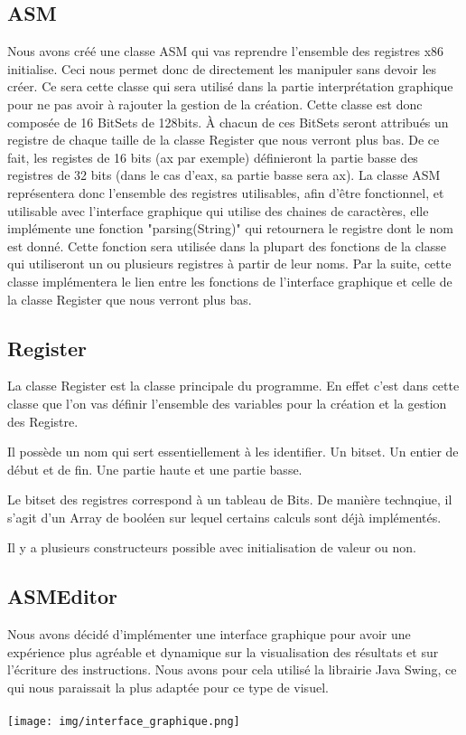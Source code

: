 \documentclass{article}
\begin{document}
\subsection{ASM}
Nous avons créé une classe ASM qui vas reprendre l'ensemble des registres x86 initialise. Ceci nous permet donc de directement les manipuler sans devoir les créer. Ce sera cette classe qui sera utilisé dans la partie interprétation graphique pour ne pas avoir à rajouter la gestion de la création.
Cette classe est donc composée de 16 BitSets de 128bits. À chacun de ces BitSets seront attribués un registre de chaque taille de la classe Register que nous verront plus bas. De ce fait, les registes de 16 bits (ax par exemple) définieront la partie basse des registres de 32 bits (dans le cas d'eax, sa partie basse sera ax).
La classe ASM représentera donc l'ensemble des registres utilisables, afin d'être fonctionnel, et utilisable avec l'interface graphique qui utilise des chaines de caractères, elle implémente une fonction "parsing(String)" qui retournera le registre dont le nom est donné.
Cette fonction sera utilisée dans la plupart des fonctions de la classe qui utiliseront un ou plusieurs registres à partir de leur noms. Par la suite, cette classe implémentera le lien entre les fonctions de l'interface graphique et celle de la classe Register que nous verront plus bas.

\subsection{Register}
La classe Register est la classe principale du programme. En effet c'est dans cette classe que l'on vas définir l'ensemble des variables pour la création et la gestion des Registre.

Il possède un nom qui sert essentiellement à les identifier.
Un bitset.
Un entier de début et de fin.
Une partie haute et une partie basse.

Le bitset des registres correspond à un tableau de Bits. De manière technqiue, il s'agit d'un Array de booléen sur lequel certains calculs sont déjà implémentés.

Il y a plusieurs constructeurs possible avec initialisation de valeur ou non.

\subsection{ASMEditor}

Nous avons décidé d'implémenter une interface graphique pour avoir une expérience plus agréable et dynamique sur la visualisation des résultats et sur
l'écriture des instructions.
Nous avons pour cela utilisé la librairie Java Swing, ce qui nous paraissait la plus adaptée pour ce type de visuel.
\\
\\
\texttt{[image: img/interface\_graphique.png]}
\end{document}
